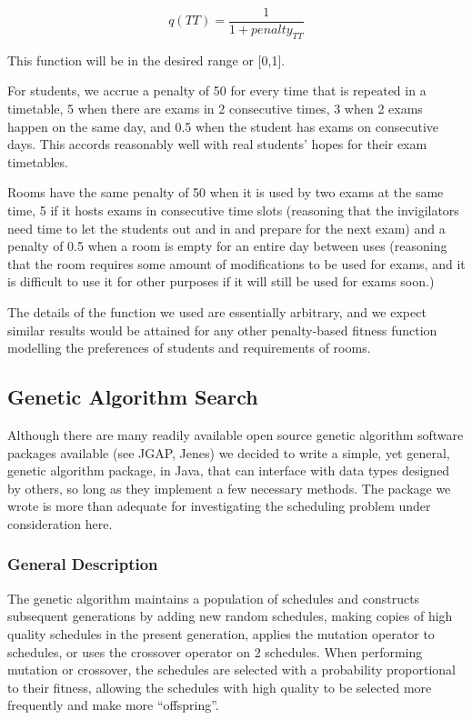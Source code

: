 \documentclass[letterpaper]{article}
\begin{document}
    \[ q(TT)=\frac{1}{1+penalty_{TT}} \]
    
    This function will be in the desired range or [0,1].
    
    For students, we accrue a penalty of 50 for every time that is repeated in a 
    timetable, 5 when there are exams in 2 consecutive times, 3 when 2 exams happen 
    on the same day, and 0.5 when the student has exams on consecutive days. This 
    accords reasonably well with real students' hopes for their exam timetables.
    
    Rooms have the same penalty of 50 when it is used by two exams at the same time, 
    5 if it hosts exams in consecutive time slots (reasoning that the invigilators 
    need time to let the students out and in and prepare for the next exam) and a 
    penalty of 0.5 when a room is empty for an entire day between uses (reasoning 
    that the room requires some amount of modifications to be used for exams, and 
    it is difficult to use it for other purposes if it will still be used for exams 
    soon.)
    
    The details of the function we used are essentially arbitrary, and we expect 
    similar results would be attained for any other penalty-based fitness function 
    modelling the preferences of students and requirements of rooms.
    
  \subsection{Genetic Algorithm Search}
    Although there are many readily available open source genetic algorithm software
    packages available (see JGAP, Jenes) we decided to write a simple, yet general, 
    genetic algorithm package, in Java, that can interface with data types designed 
    by others, so long as they implement a few necessary methods. The package we wrote 
    is more than adequate for investigating the scheduling problem under consideration here.
    
    \subsubsection{General Description}
      The genetic algorithm maintains a population of schedules and constructs subsequent
      generations by adding new random schedules, making copies of high quality schedules 
      in the present generation, applies the mutation operator to schedules, or uses the
      crossover operator on 2 schedules. When performing mutation or crossover, the 
      schedules are selected with a probability proportional to their fitness, allowing 
      the schedules with high quality to be selected more frequently and make more 
      ``offspring''. 
      
\end{document}

